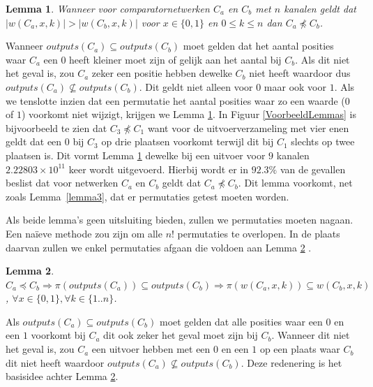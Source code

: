 \documentclass{article}
\newtheorem{lemma}{Lemma}
\begin{document}
\begin{lemma}
	Wanneer voor comparatornetwerken $C_a$ en $C_b$ met $n$ kanalen geldt dat $|w\left(C_a, x, k\right)| > |w\left(C_b, x, k\right)|$ voor $x \in \{0,1\}$ en $0 \leq k \leq n$ dan $C_a \npreceq C_b$.
	\label{lemma4}
\end{lemma}
Wanneer ${outputs(C_a) \subseteq outputs(C_b)}$ moet gelden dat het aantal posities waar $C_a$ een $0$ heeft kleiner moet zijn of gelijk aan het aantal bij $C_b$.
Als dit niet het geval is, zou $C_a$ zeker een positie hebben dewelke $C_b$ niet heeft waardoor dus ${outputs(C_a) \nsubseteq outputs(C_b)}$.
Dit geldt niet alleen voor $0$ maar ook voor $1$.
Als we tenslotte inzien dat een permutatie het aantal posities waar zo een waarde ($0$ of $1$) voorkomt niet wijzigt, krijgen we Lemma \ref{lemma4}.
In Figuur \ref{VoorbeeldLemmas} is bijvoorbeeld te zien dat $C_3 \npreceq C_1$ want voor de uitvoerverzameling met vier enen geldt dat een $0$ bij $C_3$ op drie plaatsen voorkomt terwijl dit bij $C_1$ slechts op twee plaatsen is.
Dit vormt Lemma \ref{lemma4} dewelke bij een uitvoer voor $9$ kanalen ${2.22803 \times 10^{11}}$ keer wordt uitgevoerd. Hierbij wordt er in $92.3\%$ van de gevallen beslist dat voor netwerken $C_a$ en $C_b$ geldt dat $C_a \npreceq C_b$.
Dit lemma voorkomt, net zoals Lemma~\ref{lemma3}, dat er permutaties getest moeten worden.

Als beide lemma's geen uitsluiting bieden, zullen we permutaties moeten nagaan.
Een na\"ieve methode zou zijn om alle $n!$ permutaties te overlopen.
In de plaats daarvan zullen we enkel permutaties afgaan die voldoen aan Lemma \ref{lemma5} \cite{sortingNetworksSize2014}.
\begin{lemma}
	${C_a \preceq C_b  \Rightarrow \pi\left(outputs\left(C_{a}\right)\right) \subseteq outputs\left(C_{b}\right)} \Rightarrow \pi\left(w\left(C_a, x, k\right)\right) \subseteq w\left(C_b, x, k\right)$,
	${\forall x \in \{0,1\}, \forall k \in \{1..n\}}$.
\label{lemma5}
\end{lemma}

Als ${outputs(C_a) \subseteq outputs(C_b)}$ moet gelden dat alle posities waar een $0$ en een $1$ voorkomt bij $C_a$ dit ook zeker het geval moet zijn bij $C_b$.
Wanneer dit niet het geval is, zou $C_a$ een uitvoer hebben met een $0$ en een $1$ op een plaats waar $C_b$ dit niet heeft waardoor ${outputs(C_a) \nsubseteq outputs(C_b)}$.
Deze redenering is het basisidee achter Lemma \ref{lemma5}.
\end{document}
